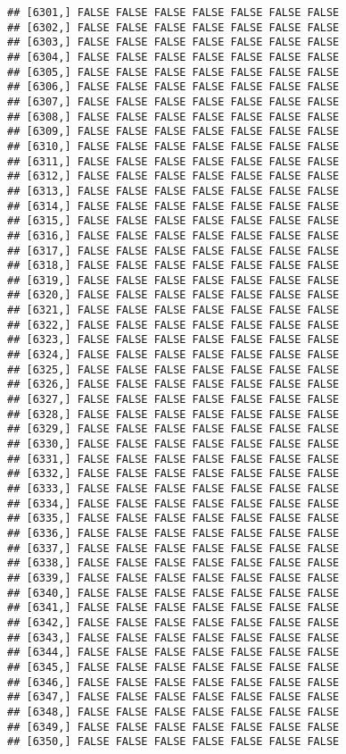 \documentclass[
]{article}
\begin{document}
\begin{verbatim}
## [6301,] FALSE FALSE FALSE FALSE FALSE FALSE FALSE
## [6302,] FALSE FALSE FALSE FALSE FALSE FALSE FALSE
## [6303,] FALSE FALSE FALSE FALSE FALSE FALSE FALSE
## [6304,] FALSE FALSE FALSE FALSE FALSE FALSE FALSE
## [6305,] FALSE FALSE FALSE FALSE FALSE FALSE FALSE
## [6306,] FALSE FALSE FALSE FALSE FALSE FALSE FALSE
## [6307,] FALSE FALSE FALSE FALSE FALSE FALSE FALSE
## [6308,] FALSE FALSE FALSE FALSE FALSE FALSE FALSE
## [6309,] FALSE FALSE FALSE FALSE FALSE FALSE FALSE
## [6310,] FALSE FALSE FALSE FALSE FALSE FALSE FALSE
## [6311,] FALSE FALSE FALSE FALSE FALSE FALSE FALSE
## [6312,] FALSE FALSE FALSE FALSE FALSE FALSE FALSE
## [6313,] FALSE FALSE FALSE FALSE FALSE FALSE FALSE
## [6314,] FALSE FALSE FALSE FALSE FALSE FALSE FALSE
## [6315,] FALSE FALSE FALSE FALSE FALSE FALSE FALSE
## [6316,] FALSE FALSE FALSE FALSE FALSE FALSE FALSE
## [6317,] FALSE FALSE FALSE FALSE FALSE FALSE FALSE
## [6318,] FALSE FALSE FALSE FALSE FALSE FALSE FALSE
## [6319,] FALSE FALSE FALSE FALSE FALSE FALSE FALSE
## [6320,] FALSE FALSE FALSE FALSE FALSE FALSE FALSE
## [6321,] FALSE FALSE FALSE FALSE FALSE FALSE FALSE
## [6322,] FALSE FALSE FALSE FALSE FALSE FALSE FALSE
## [6323,] FALSE FALSE FALSE FALSE FALSE FALSE FALSE
## [6324,] FALSE FALSE FALSE FALSE FALSE FALSE FALSE
## [6325,] FALSE FALSE FALSE FALSE FALSE FALSE FALSE
## [6326,] FALSE FALSE FALSE FALSE FALSE FALSE FALSE
## [6327,] FALSE FALSE FALSE FALSE FALSE FALSE FALSE
## [6328,] FALSE FALSE FALSE FALSE FALSE FALSE FALSE
## [6329,] FALSE FALSE FALSE FALSE FALSE FALSE FALSE
## [6330,] FALSE FALSE FALSE FALSE FALSE FALSE FALSE
## [6331,] FALSE FALSE FALSE FALSE FALSE FALSE FALSE
## [6332,] FALSE FALSE FALSE FALSE FALSE FALSE FALSE
## [6333,] FALSE FALSE FALSE FALSE FALSE FALSE FALSE
## [6334,] FALSE FALSE FALSE FALSE FALSE FALSE FALSE
## [6335,] FALSE FALSE FALSE FALSE FALSE FALSE FALSE
## [6336,] FALSE FALSE FALSE FALSE FALSE FALSE FALSE
## [6337,] FALSE FALSE FALSE FALSE FALSE FALSE FALSE
## [6338,] FALSE FALSE FALSE FALSE FALSE FALSE FALSE
## [6339,] FALSE FALSE FALSE FALSE FALSE FALSE FALSE
## [6340,] FALSE FALSE FALSE FALSE FALSE FALSE FALSE
## [6341,] FALSE FALSE FALSE FALSE FALSE FALSE FALSE
## [6342,] FALSE FALSE FALSE FALSE FALSE FALSE FALSE
## [6343,] FALSE FALSE FALSE FALSE FALSE FALSE FALSE
## [6344,] FALSE FALSE FALSE FALSE FALSE FALSE FALSE
## [6345,] FALSE FALSE FALSE FALSE FALSE FALSE FALSE
## [6346,] FALSE FALSE FALSE FALSE FALSE FALSE FALSE
## [6347,] FALSE FALSE FALSE FALSE FALSE FALSE FALSE
## [6348,] FALSE FALSE FALSE FALSE FALSE FALSE FALSE
## [6349,] FALSE FALSE FALSE FALSE FALSE FALSE FALSE
## [6350,] FALSE FALSE FALSE FALSE FALSE FALSE FALSE

\end{verbatim}
\end{document}
